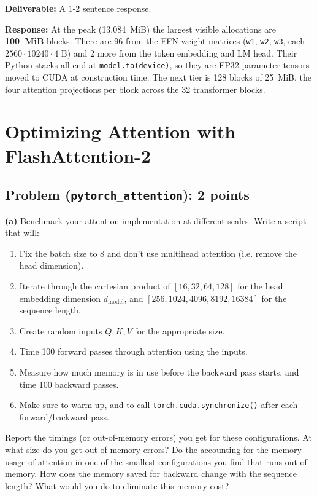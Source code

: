 \documentclass[11pt]{article}
\begin{document}
\textbf{Deliverable:} A 1-2 sentence response.

\vspace{0.25cm}
\textbf{Response:}
At the peak (13{,}084~MiB) the largest visible allocations are \textbf{100~MiB} blocks. There are 96 from the FFN weight matrices (\texttt{w1}, \texttt{w2}, \texttt{w3}, each $2560 \cdot 10240 \cdot 4 \text{ B}$) and 2 more from the token embedding and LM head. Their Python stacks all end at \verb|model.to(device)|, so they are FP32 parameter tensors moved to CUDA at construction time. The next tier is 128 blocks of 25~MiB, the four attention projections per block across the 32 transformer blocks.


\section{Optimizing Attention with FlashAttention-2}

\subsection*{Problem (\texttt{pytorch\_attention}): 2 points}

\textbf{(a)} Benchmark your attention implementation at different scales. Write a script that will:
\begin{enumerate}[label=(\arabic*)]
    \item Fix the batch size to 8 and don't use multihead attention (i.e. remove the head dimension).
    \item Iterate through the cartesian product of $[16, 32, 64, 128]$ for the head embedding dimension $d_{\text{model}}$, and $[256, 1024, 4096, 8192, 16384]$ for the sequence length.
    \item Create random inputs $Q, K, V$ for the appropriate size.
    \item Time 100 forward passes through attention using the inputs.
    \item Measure how much memory is in use before the backward pass starts, and time 100 backward passes.
    \item Make sure to warm up, and to call \texttt{torch.cuda.synchronize()} after each forward/backward pass.
\end{enumerate}
Report the timings (or out-of-memory errors) you get for these configurations. At what size do you get out-of-memory errors? Do the accounting for the memory usage of attention in one of the smallest configurations you find that runs out of memory. How does the memory saved for backward change with the sequence length? What would you do to eliminate this memory cost?
\end{document}
